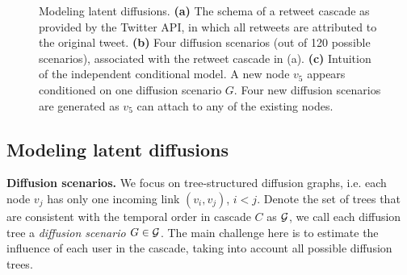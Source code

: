 \documentclass[a4paper,12pt]{article}
\begin{document}
\begin{figure}[bp]
{		\label{fig:side:b}
	}
	\hspace{0.1cm}
	\caption{ 
		Modeling latent diffusions.
		\textbf{(a)} The schema of a retweet cascade as provided by the Twitter API, in which all retweets are attributed to the original tweet.
		\textbf{(b)} Four diffusion scenarios (out of 120 possible scenarios), associated with the retweet cascade in (a).
		\textbf{(c)} Intuition of the independent conditional model.
		A new node $v_5$ appears conditioned on one diffusion scenario $G$.
		Four new diffusion scenarios are generated as $v_5$ can attach to any of the existing nodes.
	}
\end{figure}

\subsection{Modeling latent diffusions}
\label{subsec:model-latent-diffusions}

\noindent\textbf{Diffusion scenarios.}
We focus on tree-structured diffusion graphs, i.e. each node $v_j$ has only one incoming link $(v_i, v_j)$, $i<j$. 
Denote the set of trees that are consistent with the temporal order in cascade $C$ as ${\cal G}$, we call each diffusion tree a \emph{diffusion scenario} $G \in {\cal G}$.
The main challenge here is to estimate the influence of each user in the cascade, taking into account all possible diffusion trees.
\end{document}
